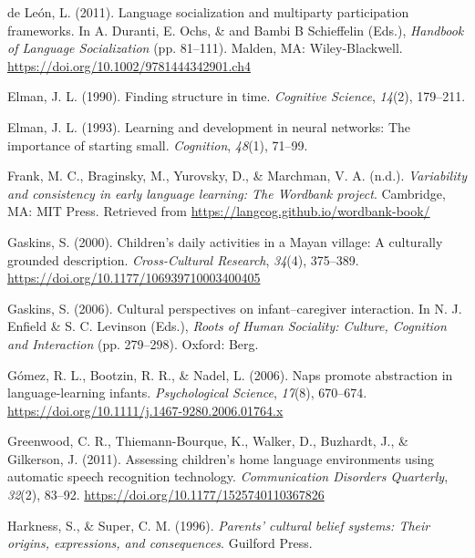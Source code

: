 \documentclass[
  english,
  ,man,floatsintext]{apa6}
\begin{document}
\leavevmode\hypertarget{ref-deleon2011language}{}%
de León, L. (2011). Language socialization and multiparty participation frameworks. In A. Duranti, E. Ochs, \& and Bambi B Schieffelin (Eds.), \emph{Handbook of Language Socialization} (pp. 81--111). Malden, MA: Wiley-Blackwell. \url{https://doi.org/10.1002/9781444342901.ch4}

\leavevmode\hypertarget{ref-elman1990finding}{}%
Elman, J. L. (1990). Finding structure in time. \emph{Cognitive Science}, \emph{14}(2), 179--211.

\leavevmode\hypertarget{ref-elman1993learning}{}%
Elman, J. L. (1993). Learning and development in neural networks: The importance of starting small. \emph{Cognition}, \emph{48}(1), 71--99.

\leavevmode\hypertarget{ref-frankIPvariability}{}%
Frank, M. C., Braginsky, M., Yurovsky, D., \& Marchman, V. A. (n.d.). \emph{Variability and consistency in early language learning: The Wordbank project}. Cambridge, MA: MIT Press. Retrieved from \url{https://langcog.github.io/wordbank-book/}

\leavevmode\hypertarget{ref-gaskins2000childrens}{}%
Gaskins, S. (2000). Children's daily activities in a Mayan village: A culturally grounded description. \emph{Cross-Cultural Research}, \emph{34}(4), 375--389. \url{https://doi.org/10.1177/106939710003400405}

\leavevmode\hypertarget{ref-gaskins2006cultural}{}%
Gaskins, S. (2006). Cultural perspectives on infant--caregiver interaction. In N. J. Enfield \& S. C. Levinson (Eds.), \emph{Roots of Human Sociality: Culture, Cognition and Interaction} (pp. 279--298). Oxford: Berg.

\leavevmode\hypertarget{ref-gomez2006naps}{}%
Gómez, R. L., Bootzin, R. R., \& Nadel, L. (2006). Naps promote abstraction in language-learning infants. \emph{Psychological Science}, \emph{17}(8), 670--674. \url{https://doi.org/10.1111/j.1467-9280.2006.01764.x}

\leavevmode\hypertarget{ref-greenwood2011assessing}{}%
Greenwood, C. R., Thiemann-Bourque, K., Walker, D., Buzhardt, J., \& Gilkerson, J. (2011). Assessing children's home language environments using automatic speech recognition technology. \emph{Communication Disorders Quarterly}, \emph{32}(2), 83--92. \url{https://doi.org/10.1177/1525740110367826}

\leavevmode\hypertarget{ref-harkness1996parents}{}%
Harkness, S., \& Super, C. M. (1996). \emph{Parents' cultural belief systems: Their origins, expressions, and consequences}. Guilford Press.
\end{document}

